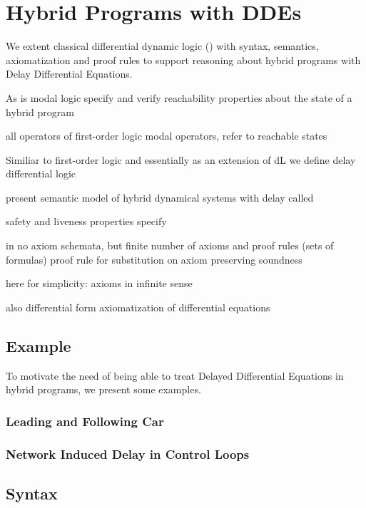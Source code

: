 \chapter{Hybrid Programs with DDEs}\label{hybrid-programs-with-ddes}


We extent classical differential dynamic logic (\dL) with syntax, semantics, axiomatization and proof rules to support reasoning about hybrid programs with Delay Differential Equations.

As \dL
\ddL is modal logic
specify and verify reachability properties about the state of a hybrid program

all operators of first-order logic
modal operators, refer to reachable states

Similiar to first-order logic and essentially as an extension of dL we define delay differential logic

present semantic model
of hybrid dynamical systems with delay
called \dHPs

safety and liveness properties specify

\dL in \cite{Platzer15Uniform} no axiom schemata, but finite number of axioms and proof rules (sets of formulas)
proof rule for substitution on axiom preserving soundness

here for simplicity: axioms in infinite sense

also differential form axiomatization of differential equations

\cite{Platzer12Complete,Platzer15Uniform}

\section{Example}
    \label{example-hp-cars}
    To motivate the need of being able to treat Delayed Differential Equations in hybrid programs, we present some examples.

    \subsection{Leading and Following Car}

    \subsection{Network Induced Delay in Control Loops}

\section{Syntax}
    \label{sec:syntax}

